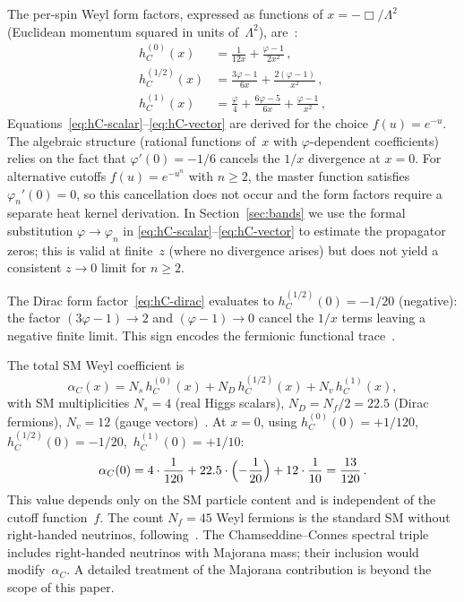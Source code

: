 \documentclass[12pt,a4paper]{article}
\theoremstyle{plain}
\theoremstyle{definition}
\theoremstyle{remark}
\begin{document}
The per-spin Weyl form factors, expressed as functions of
$x = -\Box/\Lambda^2$ (Euclidean momentum squared in units
of~$\Lambda^2$), are~\cite{CZ:2012,Alfyorov:2026paper1}:
\begin{align}
  h_C^{(0)}(x) &= \frac{1}{12x}
    + \frac{\varphi - 1}{2x^2}\,,
  \label{eq:hC-scalar}\\[4pt]
  h_C^{(1/2)}(x) &= \frac{3\varphi - 1}{6x}
    + \frac{2(\varphi - 1)}{x^2}\,,
  \label{eq:hC-dirac}\\[4pt]
  h_C^{(1)}(x) &= \frac{\varphi}{4}
    + \frac{6\varphi - 5}{6x}
    + \frac{\varphi - 1}{x^2}\,,
  \label{eq:hC-vector}
\end{align}
Equations~\eqref{eq:hC-scalar}--\eqref{eq:hC-vector} are
derived for the choice $f(u) = e^{-u}$.  The algebraic
structure (rational functions of~$x$ with $\varphi$-dependent
coefficients) relies on the fact that $\varphi'(0) = -1/6$
cancels the $1/x$ divergence at $x = 0$.  For alternative
cutoffs $f(u) = e^{-u^n}$ with $n \geq 2$, the master function
satisfies $\varphi_n'(0) = 0$, so this cancellation does not
occur and the form factors require a separate heat kernel
derivation.  In Section~\ref{sec:bands} we use the formal
substitution $\varphi \to \varphi_n$ in
\eqref{eq:hC-scalar}--\eqref{eq:hC-vector} to estimate the
propagator zeros; this is valid at finite~$z$ (where no
divergence arises) but does not yield a consistent $z \to 0$
limit for $n \geq 2$.

The Dirac form factor~\eqref{eq:hC-dirac} evaluates to
$h_C^{(1/2)}(0) = -1/20$ (negative): the factor $(3\varphi - 1)
\to 2$ and $(\varphi - 1) \to 0$ cancel the $1/x$ terms leaving
a negative finite limit.  This sign encodes the fermionic
functional trace~\cite{ParkerToms:2009}.

The total SM Weyl coefficient is
\begin{equation}\label{eq:alpha-C-def}
  \alpha_C(x) = N_s\, h_C^{(0)}(x)
    + N_D\, h_C^{(1/2)}(x)
    + N_v\, h_C^{(1)}(x),
\end{equation}
with SM multiplicities $N_s = 4$ (real Higgs scalars),
$N_D = N_f/2 = 22.5$ (Dirac fermions), $N_v = 12$ (gauge
vectors)~\cite{CPR:2008}.  At $x = 0$, using
$h_C^{(0)}(0) = +1/120$,\, $h_C^{(1/2)}(0) = -1/20$,\,
$h_C^{(1)}(0) = +1/10$:
\begin{equation}\label{eq:alpha-C-value}
  \alpha_C(0) = 4 \cdot \frac{1}{120}
    + 22.5 \cdot \Bigl(-\frac{1}{20}\Bigr)
    + 12 \cdot \frac{1}{10} = \frac{13}{120}\,.
\end{equation}
This value depends only on the SM particle content and is
independent of the cutoff function~$f$.  The count $N_f = 45$
Weyl fermions is the standard SM without right-handed neutrinos,
following~\cite{CPR:2008}.  The Chamseddine--Connes spectral
triple~\cite{CCM:2006} includes right-handed neutrinos with
Majorana mass; their inclusion would modify~$\alpha_C$.  A
detailed treatment of the Majorana contribution is beyond the
scope of this paper.
\end{document}
